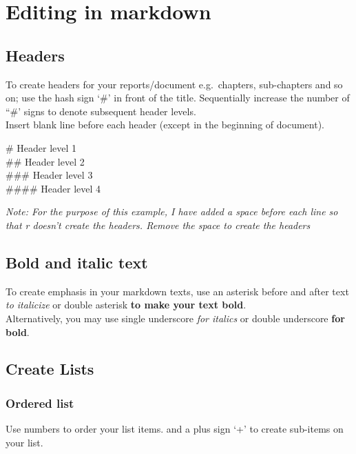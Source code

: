 \documentclass[
]{book}
\begin{document}
\hypertarget{editing-in-markdown}{%
\section{Editing in markdown}\label{editing-in-markdown}}

\hypertarget{headers}{%
\subsection{Headers}\label{headers}}

To create headers for your reports/document e.g.~chapters, sub-chapters and so on; use the hash sign `\#' in front of the title. Sequentially increase the number of ``\#' signs to denote subsequent header levels.\\
Insert blank line before each header (except in the beginning of document).

\# Header level 1\\
\#\# Header level 2\\
\#\#\# Header level 3\\
\#\#\#\# Header level 4

\emph{Note: For the purpose of this example, I have added a space before each line so that r doesn't create the headers. Remove the space to create the headers}

\hypertarget{bold-and-italic-text}{%
\subsection{Bold and italic text}\label{bold-and-italic-text}}

To create emphasis in your markdown texts, use an asterisk before and after text \emph{to italicize} or double asterisk \textbf{to make your text bold}.\\
Alternatively, you may use single underscore \emph{for italics} or double underscore \textbf{for bold}.

\hypertarget{create-lists}{%
\subsection{Create Lists}\label{create-lists}}

\hypertarget{ordered-list}{%
\subsubsection{Ordered list}\label{ordered-list}}

Use numbers to order your list items.
and a plus sign `+' to create sub-items on your list.
\end{document}
